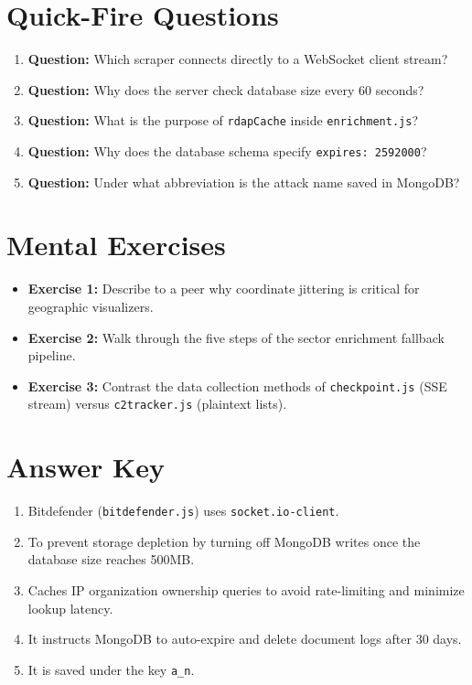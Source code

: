 \documentclass[11pt,a4paper]{report}
\begin{document}
\section{Quick-Fire Questions}
\begin{enumerate}
  \item \textbf{Question:} Which scraper connects directly to a WebSocket client stream?
  \item \textbf{Question:} Why does the server check database size every 60 seconds?
  \item \textbf{Question:} What is the purpose of \texttt{rdapCache} inside \texttt{enrichment.js}?
  \item \textbf{Question:} Why does the database schema specify \texttt{expires: 2592000}?
  \item \textbf{Question:} Under what abbreviation is the attack name saved in MongoDB?
\end{enumerate}

\section{Mental Exercises}
\begin{itemize}
  \item \textbf{Exercise 1:} Describe to a peer why coordinate jittering is critical for geographic visualizers.
  \item \textbf{Exercise 2:} Walk through the five steps of the sector enrichment fallback pipeline.
  \item \textbf{Exercise 3:} Contrast the data collection methods of \texttt{checkpoint.js} (SSE stream) versus \texttt{c2tracker.js} (plaintext lists).
\end{itemize}

\section{Answer Key}
\begin{enumerate}
  \item Bitdefender (\texttt{bitdefender.js}) uses \texttt{socket.io-client}.
  \item To prevent storage depletion by turning off MongoDB writes once the database size reaches 500MB.
  \item Caches IP organization ownership queries to avoid rate-limiting and minimize lookup latency.
  \item It instructs MongoDB to auto-expire and delete document logs after 30 days.
  \item It is saved under the key \texttt{a\_n}.
\end{enumerate}
\end{document}
